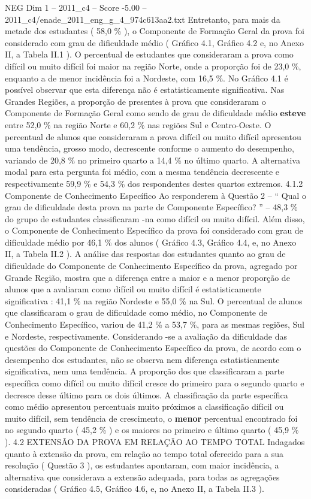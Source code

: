 \begin{textsample}{NEG Dim 1 – 2011\_c4 – Score -5.00 – 2011\_c4/enade\_2011\_eng\_g\_4\_974c613aa2.txt}
Entretanto, para mais da metade dos estudantes ( 58,0 \% ), o Componente de Formação Geral da prova foi considerado com grau de dificuldade médio ( Gráfico 4.1, Gráfico 4.2 e, no Anexo II, a Tabela II.1 ).
O percentual de estudantes que consideraram a prova como difícil ou muito difícil foi maior na região Norte, onde a proporção foi de 23,0 \%, enquanto a de menor incidência foi a Nordeste, com 16,5 \%.
No Gráfico 4.1 é possível observar que esta diferença não é estatisticamente significativa.
Nas Grandes Regiões, a proporção de presentes à prova que consideraram o Componente de Formação Geral como sendo de grau de dificuldade médio \textbf{esteve} entre 52,0 \% na região Norte e 60,2 \% nas regiões Sul e Centro-Oeste.
O percentual de alunos que consideraram a prova difícil ou muito difícil apresentou uma tendência, grosso modo, decrescente conforme o aumento do desempenho, variando de 20,8 \% no primeiro quarto a 14,4 \% no último quarto.
A alternativa modal para esta pergunta foi médio, com a mesma tendência decrescente e respectivamente 59,9 \% e 54,3 \% dos respondentes destes quartos extremos. 4.1.2 Componente de Conhecimento Específico Ao responderem à Questão 2 – “ Qual o grau de dificuldade desta prova na parte de Componente Específico? ” – 48,3 \% do grupo de estudantes classificaram -na como difícil ou muito difícil.
Além disso, o Componente de Conhecimento Específico da prova foi considerado com grau de dificuldade médio por 46,1 \% dos alunos ( Gráfico 4.3, Gráfico 4.4, e, no Anexo II, a Tabela II.2 ).
A análise das respostas dos estudantes quanto ao grau de dificuldade do Componente de Conhecimento Específico da prova, agregado por Grande Região, mostra que a diferença entre a maior e a menor proporção de alunos que a avaliaram como difícil ou muito difícil é estatisticamente significativa : 41,1 \% na região Nordeste e 55,0 \% na Sul.
O percentual de alunos que classificaram o grau de dificuldade como médio, no Componente de Conhecimento Específico, variou de 41,2 \% a 53,7 \%, para as mesmas regiões, Sul e Nordeste, respectivamente.
Considerando -se a avaliação da dificuldade das questões do Componente de Conhecimento Específico da prova, de acordo com o desempenho dos estudantes, não se observa nem diferença estatisticamente significativa, nem uma tendência.
A proporção dos que classificaram a parte específica como difícil ou muito difícil cresce do primeiro para o segundo quarto e decresce desse último para os dois últimos.
A classificação da parte específica como médio apresentou percentuais muito próximos a classificação difícil ou muito difícil, sem tendência de crescimento, o \textbf{menor} percentual encontrado foi no segundo quarto ( 45,2 \% ) e os maiores no primeiro e último quarto ( 45,9 \% ). 4.2 EXTENSÃO DA PROVA EM RELAÇÃO AO TEMPO TOTAL Indagados quanto à extensão da prova, em relação ao tempo total oferecido para a sua resolução ( Questão 3 ), os estudantes apontaram, com maior incidência, a alternativa que considerava a extensão adequada, para todas as agregações consideradas ( Gráfico 4.5, Gráfico 4.6, e, no Anexo II, a Tabela II.3 ).

\end{textsample}
